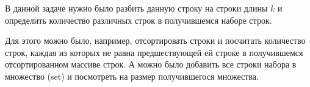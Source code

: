 \solutionSection

В данной задаче нужно было разбить данную строку на строки длины $k$ и
определить количество различных строк в получившемся наборе строк.

Для этого можно было, например, отсортировать строки и посчитать количество строк,
каждая из которых не равна предшествующей ей строке в получившемся отсортированном массиве строк.
А можно было добавить все строки набора в множество (set) и посмотреть на размер получившегося множества.

\codeExample

